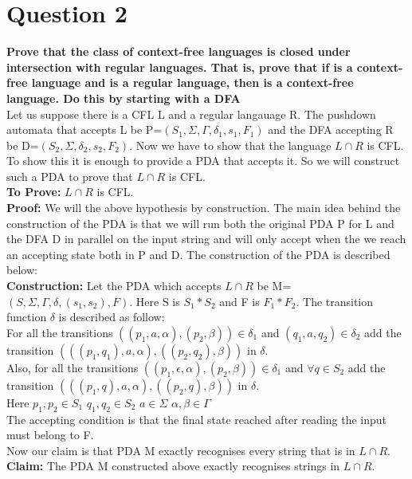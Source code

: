 \documentclass{article}
\begin{document}
\section{Question 2}
\textbf{Prove that the class of context-free languages is closed under intersection with regular languages. That is, prove that if  is a context-free language and  is a regular language, then 
is a context-free language. Do this by starting with a DFA}\\
\newline
Let us suppose there is a CFL L and a regular langauage R. The pushdown automata that accepts L be P=$(S_1,\Sigma,\Gamma,\delta_1,s_1,F_1)$ and the DFA accepting R be D=$(S_2,\Sigma,\delta_2,s_2,F_2)$. Now we have to show that the language $L\cap R$ is CFL. To show this it is enough to provide a PDA that accepts it. So we will construct such a PDA to prove that  $L\cap R$ is CFL. \\
\textbf{To Prove:} $L\cap R$ is CFL. \\
\textbf{Proof:} We will the above hypothesis by construction. The main idea behind the construction of the PDA is that we will run both the original PDA P for L and the DFA D in parallel on the input string and will only accept when the we reach an accepting state both in P and D. The construction of the PDA is described below:\\
\textbf{Construction:} Let the PDA which accepts $L\cap R$ be M=$(S,\Sigma,\Gamma,\delta,(s_1,s_2),F)$. Here S is $S_1 * S_2$ and F is $F_1 *F_2$. The transition function $\delta$ is described as follow: \\
For all the transitions $((p_1,a,\alpha),(p_2,\beta)) \in \delta_1$  and $(q_1,a,q_2) \in \delta_2$ add the transition $(((p_1,q_1),a,\alpha),((p_2,q_2),\beta))$ in $\delta$.\\
Also, for all the transitions $((p_1,\epsilon,\alpha),(p_2,\beta)) \in \delta_1$  and $\forall q \in S_2$ add the transition $(((p_1,q),a,\alpha),((p_2,q),\beta))$ in $\delta$.\\
Here $p_1,p_2 \in S_1$  $q_1,q_2 \in S_2$  $a \in \Sigma$  $\alpha , \beta \in \Gamma$\\
The accepting condition is that the final state reached after reading the input must belong to F.\\
Now our claim is that PDA M exactly recognises every string that is in $L\cap R$. \\
\textbf{Claim:} The PDA M constructed above exactly recognises strings in $L\cap R$. \\
\end{document}
